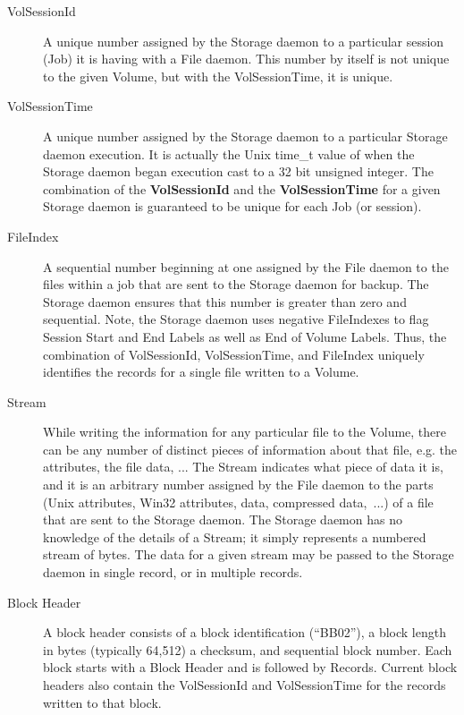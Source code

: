 \begin{description}
\item [VolSessionId]
   A unique number assigned by the Storage daemon  to a particular session (Job)
it is having with a File  daemon. This number by itself is not unique to the 
given Volume, but with the VolSessionTime, it is unique.  

\item [VolSessionTime]
   A unique number assigned by the Storage daemon  to a particular Storage daemon
execution. It is actually  the Unix time\_t value of when the Storage daemon
began  execution cast to a 32 bit unsigned integer. The combination  of the
{\bf VolSessionId} and the {\bf VolSessionTime}  for a given Storage daemon is
guaranteed to be unique for each  Job (or session). 

\item [FileIndex]
   A sequential number beginning at one assigned by the File  daemon to the files
within a job that are sent to the Storage daemon  for backup. The Storage
daemon ensures that this number  is greater than zero and sequential. Note,
the Storage  daemon uses negative FileIndexes to flag Session Start  and End
Labels as well as End of Volume Labels. Thus, the  combination of
VolSessionId, VolSessionTime, and FileIndex  uniquely identifies the records
for a single file written  to a Volume.  

\item [Stream]
   While writing the information for any particular  file to the Volume, there
can be any number of distinct  pieces of information about that file, e.g. the
attributes,  the file data, ... The Stream indicates what piece of data  it
is, and it is an arbitrary number assigned by the File daemon to the  parts
(Unix attributes, Win32 attributes, data, compressed data,\ ...) of a file
that are sent to  the Storage daemon. The Storage daemon has no knowledge of 
the details of a Stream; it simply represents a numbered  stream of bytes. The
data for a given stream may be  passed to the Storage daemon in single record,
or in multiple  records.  

\item [Block Header]
   A block header consists of a block identification  (``BB02''), a block length
in bytes (typically  64,512) a checksum, and sequential block number.  Each
block starts with a Block Header and is followed  by Records. Current block
headers also contain the VolSessionId  and VolSessionTime for the records
written to that block.  


\end{description}
